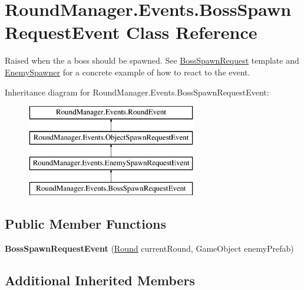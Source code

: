 \hypertarget{class_round_manager_1_1_events_1_1_boss_spawn_request_event}{}\section{Round\+Manager.\+Events.\+Boss\+Spawn\+Request\+Event Class Reference}
\label{class_round_manager_1_1_events_1_1_boss_spawn_request_event}


Raised when the a boss should be spawned. See \hyperlink{class_round_manager_1_1_boss_spawn_request}{Boss\+Spawn\+Request} template and \hyperlink{class_round_manager_1_1_enemy_spawner}{Enemy\+Spawner} for a concrete example of how to react to the event.  


Inheritance diagram for Round\+Manager.\+Events.\+Boss\+Spawn\+Request\+Event\+:\begin{figure}[H]
\begin{center}
\leavevmode
\includegraphics[height=4.000000cm]{class_round_manager_1_1_events_1_1_boss_spawn_request_event}
\end{center}
\end{figure}
\subsection*{Public Member Functions}
\begin{DoxyCompactItemize}
\item 
\hypertarget{class_round_manager_1_1_events_1_1_boss_spawn_request_event_a24cc5fc685a6ad644ee88485a6ba34d0}{}{\bfseries Boss\+Spawn\+Request\+Event} (\hyperlink{class_round_manager_1_1_round}{Round} current\+Round, Game\+Object enemy\+Prefab)\label{class_round_manager_1_1_events_1_1_boss_spawn_request_event_a24cc5fc685a6ad644ee88485a6ba34d0}

\end{DoxyCompactItemize}
\subsection*{Additional Inherited Members}


